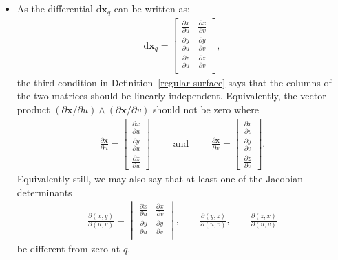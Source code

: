 \documentclass[10pt]{article}
\newtheorem{definition}[lemma]{Definition}
\newcommand{\dee}{\mathrm{d}}
\newcommand{\ve}[1]{\mathbf{#1}}
\newcommand{\ra}{\rightarrow}
\newcommand{\Real}{\mathbb{R}}
\begin{document}
\begin{itemize}
\begin{definition}
\begin{enumerate}
        \item (The regularity condition.) For each $q \in U$, the differential $\dee \ve{x}_q : \Real^2 \ra \Real^3$ is one-to-one.
      \end{enumerate}
    \end{definition}

    The mapping $\ve{x}$ is called a {\bf parametermization} or a {\bf system of (local) coordinates} in a neighborhood of $p$.

    The neighborhood $V \cap S$ is called a {\bf coordinate neighborhood}.

    \item As the differential $\dee \ve{x}_q$ can be written as:
    \begin{align*}
      \dee \ve{x}_q
      = \displaystyle \begin{bmatrix}
        \frac{\partial x}{\partial u} & \frac{\partial x}{\partial v}\\
        \frac{\partial y}{\partial u} & \frac{\partial y}{\partial v}\\
        \frac{\partial z}{\partial u} & \frac{\partial z}{\partial v}\\
      \end{bmatrix},
    \end{align*}
    the third condition in Definition~\ref{regular-surface} says that the columns of the two matrices should be linearly independent. Equivalently, the vector product $(\partial \ve{x} / \partial u) \wedge (\partial \ve{x} / \partial v)$ should not be zero where
    \begin{align*}
      \frac{\partial \ve{x}}{\partial u} = \begin{bmatrix}
        \frac{\partial x}{\partial u}\\
        \frac{\partial y}{\partial u}\\
        \frac{\partial z}{\partial u}
      \end{bmatrix}
      \qquad\mbox{ and }\qquad
      \frac{\partial \ve{x}}{\partial v} = \begin{bmatrix}
        \frac{\partial x}{\partial v}\\
        \frac{\partial y}{\partial v}\\
        \frac{\partial z}{\partial v}
      \end{bmatrix}.
    \end{align*}
    Equivalently still, we may also say that at least one of the Jacobian determinants
    \begin{align*}
      \frac{\partial(x,y)}{\partial(u,v)} = \begin{vmatrix}
        \frac{\partial x}{\partial u} & \frac{\partial x}{\partial v}\\
        \frac{\partial y}{\partial u} & \frac{\partial y}{\partial v}\\
      \end{vmatrix},
      \qquad
      \frac{\partial(y,z)}{\partial(u,v)},
      \qquad
      \frac{\partial(z,x)}{\partial(u,v)}
    \end{align*}
    be different from zero at $q$.
  \end{itemize}
\end{document}
